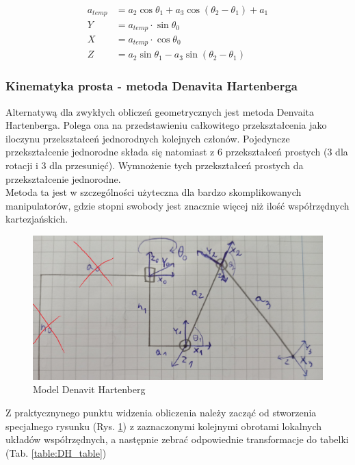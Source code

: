 \documentclass[a4paper,13pt]{article}
\begin{document}
\begin{equation} \label{FK_ver_1}
\begin{split}
a_{temp} &= a_2 \cos{\theta_1} + a_3 \cos{\left(\theta_2 - \theta_1\right)} + a_1\\
Y &= a_{temp} \cdot \sin{\theta_0}\\
X &= a_{temp} \cdot \cos{\theta_0}\\
Z &= a_2 \sin{\theta_1} - a_3 \sin{\left(\theta_2 - \theta_1\right)}
\end{split}
\end{equation}

\subsubsection{Kinematyka prosta - metoda Denavita Hartenberga \cite{DH_AA_article}}
Alternatywą dla zwykłych obliczeń geometrycznych jest metoda Denvaita Hartenberga. Polega ona na przedstawieniu całkowitego przekształcenia jako iloczynu przekształceń jednorodnych kolejnych członów. Pojedyncze przekształcenie jednorodne składa się natomiast z 6 przekształceń prostych (3 dla rotacji i 3 dla przesunięć). Wymnożenie tych przekształceń prostych da przekształcenie jednorodne. \cite{DH_wpaszke_wyklad}\\

Metoda ta jest w szczególności użyteczna dla bardzo skomplikowanych manipulatorów, gdzie stopni swobody jest znacznie więcej niż ilość współrzędnych kartezjańskich.\\

\begin{figure}[H]
\includegraphics[width=\textwidth]{img/DH_model.jpg}
\caption{Model Denavit Hartenberg}
\label{math_model_DH}
\end{figure}

Z praktycznynego punktu widzenia obliczenia należy zacząć od stworzenia specjalnego rysunku (Rys. \ref{math_model_DH}) z zaznaczonymi kolejnymi obrotami lokalnych układów współrzędnych, a następnie zebrać odpowiednie transformacje do tabelki (Tab. \ref{table:DH_table})\\
\end{document}
